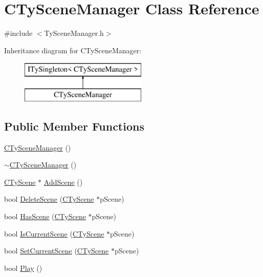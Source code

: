\hypertarget{class_c_ty_scene_manager}{
\section{CTySceneManager Class Reference}
\label{class_c_ty_scene_manager}
}


{\ttfamily \#include $<$TySceneManager.h$>$}

Inheritance diagram for CTySceneManager:\begin{figure}[H]
\begin{center}
\leavevmode
\includegraphics[height=2.000000cm]{class_c_ty_scene_manager}
\end{center}
\end{figure}
\subsection*{Public Member Functions}
\begin{DoxyCompactItemize}
\item 
\hyperlink{class_c_ty_scene_manager_ae33a8e4522ee48f583de3c8c77677a86}{CTySceneManager} ()
\item 
\hyperlink{class_c_ty_scene_manager_aac52fbc8d089652d045d48e39611c265}{$\sim$CTySceneManager} ()
\item 
\hyperlink{class_c_ty_scene}{CTyScene} $\ast$ \hyperlink{class_c_ty_scene_manager_af405b87fe6274a705b157d3642ffe60c}{AddScene} ()
\item 
bool \hyperlink{class_c_ty_scene_manager_af7bd89a145e9c374572b53fe4c3f2399}{DeleteScene} (\hyperlink{class_c_ty_scene}{CTyScene} $\ast$pScene)
\item 
bool \hyperlink{class_c_ty_scene_manager_ac4906cf4d9211c23f57819a4bc718772}{HasScene} (\hyperlink{class_c_ty_scene}{CTyScene} $\ast$pScene)
\item 
bool \hyperlink{class_c_ty_scene_manager_aba2686282098fca870c3411cb759ab5c}{IsCurrentScene} (\hyperlink{class_c_ty_scene}{CTyScene} $\ast$pScene)
\item 
bool \hyperlink{class_c_ty_scene_manager_a9c627181dd23de9e2a8441c63a67d236}{SetCurrentScene} (\hyperlink{class_c_ty_scene}{CTyScene} $\ast$pScene)
\item 
bool \hyperlink{class_c_ty_scene_manager_ac6ac387c844a7149f0763c39dd7b409b}{Play} ()
\end{DoxyCompactItemize}


